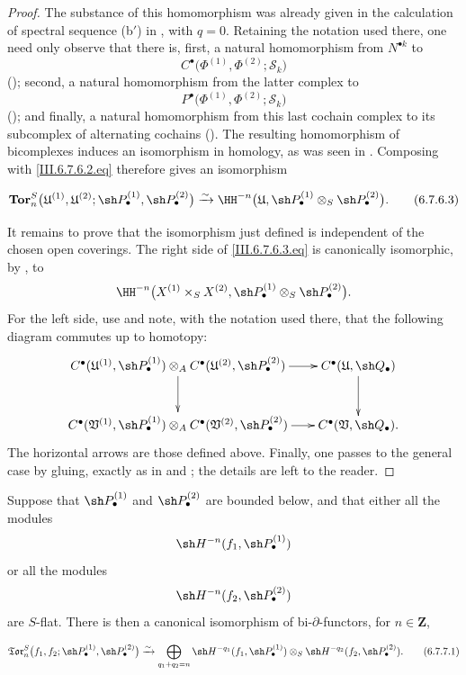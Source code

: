 \begin{proof}
The substance of this homomorphism was already given in the
calculation of spectral sequence \textnormal{(b$'$)} in
, with $q=0$.  Retaining the notation used
there, one need only observe that there is, first, a natural
homomorphism from $N^{\bullet k}$ to
\[
  C^\bullet
  \bigl(
    \Phi^{(1)},\Phi^{(2)};\mathcal S_k
  \bigr)
\]
(); second, a natural homomorphism from the
latter complex to
\[
  P^\bullet
  \bigl(
    \Phi^{(1)},\Phi^{(2)};\mathcal S_k
  \bigr)
\]
(); and finally, a natural homomorphism from
this last cochain complex to its subcomplex of alternating
cochains ().  The resulting homomorphism of
bicomplexes induces an isomorphism in homology, as was seen in
.  Composing with
\eqref{III.6.7.6.2.eq} therefore gives an isomorphism
\begin{env}[6.7.6.3]
\label{III.6.7.6.3}
\[
  \mathbf{Tor}_n^S
  \bigl(
    \mathfrak U^{(1)},\mathfrak U^{(2)};
    \sh P_\bullet^{(1)},\sh P_\bullet^{(2)}
  \bigr)
  \xrightarrow{\sim}
  \HH^{-n}
  \bigl(
    \mathfrak U,
    \sh P_\bullet^{(1)}
    \otimes_S\sh P_\bullet^{(2)}
  \bigr).
  \tag{6.7.6.3}\label{III.6.7.6.3.eq}
\]
\end{env}

It remains to prove that the isomorphism just defined is
independent of the chosen open coverings.  The right side of
\eqref{III.6.7.6.3.eq} is canonically isomorphic, by
, to
\[
  \HH^{-n}
  \bigl(
    X^{(1)}\times_SX^{(2)},
    \sh P_\bullet^{(1)}
    \otimes_S\sh P_\bullet^{(2)}
  \bigr).
\]
For the left side, use  and note, with the
notation used there, that the following diagram commutes up to
homotopy:
\[
\xymatrix@C=18pt@R=28pt{
  C^\bullet(\mathfrak U^{(1)},\sh P_\bullet^{(1)})
  \otimes_A
  C^\bullet(\mathfrak U^{(2)},\sh P_\bullet^{(2)})
  \ar[r]\ar[d]
  &
  C^\bullet(\mathfrak U,\sh Q_\bullet)
  \ar[d]
  \\
  C^\bullet(\mathfrak V^{(1)},\sh P_\bullet^{(1)})
  \otimes_A
  C^\bullet(\mathfrak V^{(2)},\sh P_\bullet^{(2)})
  \ar[r]
  &
  C^\bullet(\mathfrak V,\sh Q_\bullet).
}
\]
The horizontal arrows are those defined above.  Finally, one
passes to the general case by gluing, exactly as in
 and ; the details are left to
the reader.
\end{proof}

\begin{proposition}[6.7.7]
\label{III.6.7.7}
Suppose that $\sh P_\bullet^{(1)}$ and
$\sh P_\bullet^{(2)}$ are bounded below, and that either all the
modules
\[
  \sh H^{-n}(f_1,\sh P_\bullet^{(1)})
\]
or all the modules
\[
  \sh H^{-n}(f_2,\sh P_\bullet^{(2)})
\]
are $S$-flat.  There is then a canonical isomorphism of
bi-$\partial$-functors, for $n\in\mathbf Z$,
\begin{env}[6.7.7.1]
\label{III.6.7.7.1}
\[
  \mathfrak{Tor}_n^S
  \bigl(
    f_1,f_2;
    \sh P_\bullet^{(1)},\sh P_\bullet^{(2)}
  \bigr)
  \xrightarrow{\sim}
  \bigoplus_{q_1+q_2=n}
  \sh H^{-q_1}(f_1,\sh P_\bullet^{(1)})
  \otimes_S
  \sh H^{-q_2}(f_2,\sh P_\bullet^{(2)}).
  \tag{6.7.7.1}\label{III.6.7.7.1.eq}
\]
\end{env}
\end{proposition}

